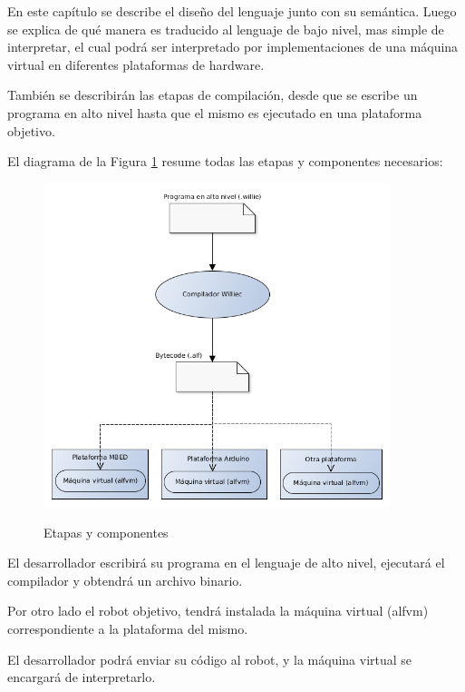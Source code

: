 
  En este capítulo se describe el diseño del lenguaje \frob{} junto con su semántica.
  Luego se explica de qué manera es traducido al lenguaje \alf{} de bajo nivel, mas
simple de interpretar, el cual podrá ser interpretado por implementaciones de
una máquina virtual en diferentes plataformas de hardware.

  También se describirán las etapas de compilación, desde que se escribe
un programa en alto nivel hasta que el mismo es ejecutado en una
plataforma objetivo.

  El diagrama de la Figura \ref{fig:compilacion} resume todas las etapas y
componentes necesarios:

\begin{figure}[h]
\begin{center}
\caption{Etapas y componentes}
\includegraphics[width=0.9\textwidth]{graphs/compilacion.png}
\label{fig:compilacion}
\end{center}
\end{figure}

  El desarrollador escribirá su programa en el lenguaje \frob{} de alto
nivel, ejecutará el compilador y obtendrá un archivo \alf{} binario.

  Por otro lado el robot objetivo, tendrá instalada la máquina
virtual (alfvm) correspondiente a la plataforma del mismo.

  El desarrollador podrá enviar su código \alf{} al robot, y la máquina
virtual se encargará de interpretarlo.

